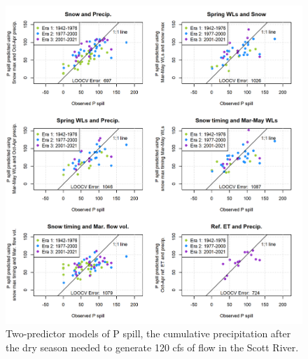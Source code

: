 \documentclass[hess, manuscript]{copernicus}
\begin{document}
\begin{figure}
\includegraphics[width=1\linewidth]{f15} \caption{\label{fig:two_predictor_model_p_spill} Two-predictor models of P spill, the cumulative precipitation after the dry season needed to generate 120 cfs of flow in the Scott River.}\label{fig:two_predictor_model_p_spill}
\end{figure}
\end{document}
